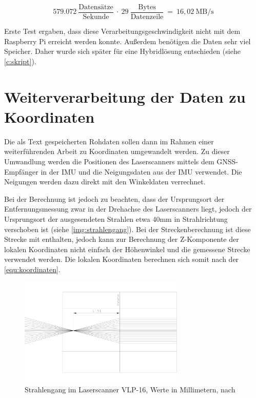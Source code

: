 \documentclass[a4paper,12pt,bibliography=totoc, listof=totoc,titlepage,pointlessnumbers]{scrreprt}
\begin{document}
\begin{equation}
579.072~\frac{\text{Datens\"{a}tze}}{\text{Sekunde}}~\cdot~29~\frac{\text{Bytes}}{\text{Datenzeile}}~=~16,02~\text{MB/s}
\label{equ:Datenrate}
\end{equation}

Erste Test ergaben, dass diese Verarbeitungsgeschwindigkeit nicht mit dem Raspberry Pi erreicht werden konnte. Außerdem benötigen die Daten sehr viel Speicher. Daher wurde sich später für eine Hybridlösung entschieden (siehe \autoref{c:skript}).

\section{Weiterverarbeitung der Daten zu Koordinaten}
Die als Text gespeicherten Rohdaten sollen dann im Rahmen einer weiterführenden Arbeit zu Koordinaten umgewandelt werden. Zu dieser Umwandlung werden die Positionen des Laserscanners mittels dem GNSS-Empfänger in der IMU und die Neigungsdaten aus der IMU verwendet. Die Neigungen werden dazu direkt mit den Winkeldaten verrechnet.

Bei der Berechnung ist jedoch zu beachten, dass der Ursprungsort der Entfernungsmessung zwar in der Drehachse des Laserscanners liegt, jedoch der Ursprungsort der ausgesendeten Strahlen etwa 40mm in Strahlrichtung verschoben ist (siehe \autoref{img:strahlengang}). Bei der Streckenberechnung ist diese Strecke mit enthalten, jedoch kann zur Berechnung der Z-Komponente der lokalen Koordinaten nicht einfach der Höhenwinkel und die gemessene Strecke verwendet werden. Die lokalen Koordinaten berechnen sich somit nach der \autoref{equ:koordinaten}.

\begin{figure}[ht!]
 \centering
 \includegraphics[width=0.7\textwidth]{./img/Strahlengang.png}
 \caption{Strahlengang im Laserscanner VLP-16, Werte in Millimetern, nach 
\citet{vlpCAD}}
 \label{img:strahlengang}
\end{figure}
\end{document}
